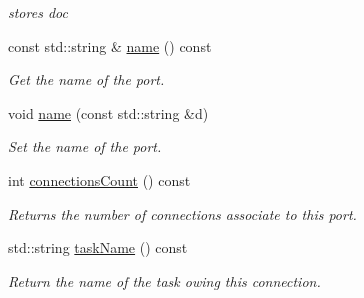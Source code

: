 \begin{DoxyCompactItemize}
\begin{DoxyCompactList}\small\item\em stores doc \end{DoxyCompactList}\item 
\hypertarget{classcoco_1_1_port_base_abf4eb7fcc3ec9973ee73dd140e7646db}{}const std\+::string \& \hyperlink{classcoco_1_1_port_base_abf4eb7fcc3ec9973ee73dd140e7646db}{name} () const \label{classcoco_1_1_port_base_abf4eb7fcc3ec9973ee73dd140e7646db}

\begin{DoxyCompactList}\small\item\em Get the name of the port. \end{DoxyCompactList}\item 
\hypertarget{classcoco_1_1_port_base_a288503d386fa9cd3022fe4437b377e5b}{}void \hyperlink{classcoco_1_1_port_base_a288503d386fa9cd3022fe4437b377e5b}{name} (const std\+::string \&d)\label{classcoco_1_1_port_base_a288503d386fa9cd3022fe4437b377e5b}

\begin{DoxyCompactList}\small\item\em Set the name of the port. \end{DoxyCompactList}\item 
\hypertarget{classcoco_1_1_port_base_ab2ec3f4ef49a5afec734149b75644709}{}int \hyperlink{classcoco_1_1_port_base_ab2ec3f4ef49a5afec734149b75644709}{connections\+Count} () const \label{classcoco_1_1_port_base_ab2ec3f4ef49a5afec734149b75644709}

\begin{DoxyCompactList}\small\item\em Returns the number of connections associate to this port. \end{DoxyCompactList}\item 
\hypertarget{classcoco_1_1_port_base_afbcff166e210e06142a9bbfb9c8c03f3}{}std\+::string \hyperlink{classcoco_1_1_port_base_afbcff166e210e06142a9bbfb9c8c03f3}{task\+Name} () const \label{classcoco_1_1_port_base_afbcff166e210e06142a9bbfb9c8c03f3}

\begin{DoxyCompactList}\small\item\em Return the name of the task owing this connection. \end{DoxyCompactList}\end{DoxyCompactItemize}
